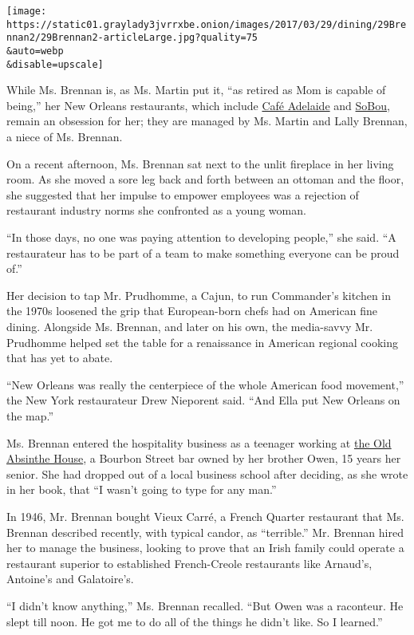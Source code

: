 \texttt{[image: https://static01.graylady3jvrrxbe.onion/images/2017/03/29/dining/29Brennan2/29Brennan2-articleLarge.jpg?quality=75\\\&auto=webp\\\&disable=upscale]}

While Ms. Brennan is, as Ms. Martin put it, ``as retired as Mom is
capable of being,'' her New Orleans restaurants, which include
\href{http://www.cafeadelaide.com/}{Café Adelaide} and
\href{http://www.sobounola.com/}{SoBou}, remain an obsession for her;
they are managed by Ms. Martin and Lally Brennan, a niece of Ms.
Brennan.

On a recent afternoon, Ms. Brennan sat next to the unlit fireplace in
her living room. As she moved a sore leg back and forth between an
ottoman and the floor, she suggested that her impulse to empower
employees was a rejection of restaurant industry norms she confronted as
a young woman.

``In those days, no one was paying attention to developing people,'' she
said. ``A restaurateur has to be part of a team to make something
everyone can be proud of.''

Her decision to tap Mr. Prudhomme, a Cajun, to run Commander's kitchen
in the 1970s loosened the grip that European-born chefs had on American
fine dining. Alongside Ms. Brennan, and later on his own, the
media-savvy Mr. Prudhomme helped set the table for a renaissance in
American regional cooking that has yet to abate.

``New Orleans was really the centerpiece of the whole American food
movement,'' the New York restaurateur Drew Nieporent said. ``And Ella
put New Orleans on the map.''

Ms. Brennan entered the hospitality business as a teenager working at
\href{http://www.ruebourbon.com/oldabsinthehouse/}{the Old Absinthe
House}, a Bourbon Street bar owned by her brother Owen, 15 years her
senior. She had dropped out of a local business school after deciding,
as she wrote in her book, that ``I wasn't going to type for any man.''

In 1946, Mr. Brennan bought Vieux Carré, a French Quarter restaurant
that Ms. Brennan described recently, with typical candor, as
``terrible.'' Mr. Brennan hired her to manage the business, looking to
prove that an Irish family could operate a restaurant superior to
established French-Creole restaurants like Arnaud's, Antoine's and
Galatoire's.

``I didn't know anything,'' Ms. Brennan recalled. ``But Owen was a
raconteur. He slept till noon. He got me to do all of the things he
didn't like. So I learned.''

